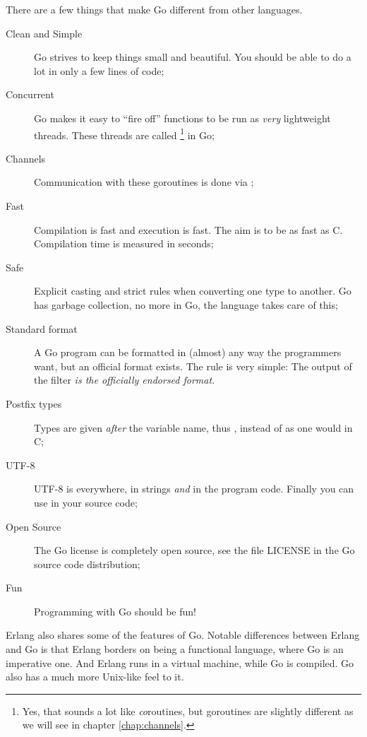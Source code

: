 \noindent{}There are a few things that make Go different from other
languages.
\begin{description}
\item[Clean and Simple]
Go strives to keep things small and beautiful. You should
be able to do a lot in only a few lines of code;
\item[Concurrent]
Go makes it easy to ``fire off'' functions to be
run as \emph{very} lightweight threads. These threads are called
 \footnote{Yes, that sounds a lot like
\emph{co}routines, but goroutines are slightly different as we will
see in chapter \ref{chap:channels}.} in Go;
\item[Channels] 
Communication with these goroutines is done
via  \cite{csp, hoare};

\item[Fast]
Compilation is fast and execution is fast. The aim is
to be as fast as C. Compilation time is measured in seconds;

\item[Safe]
Explicit casting and strict rules when converting one type to another.
Go has garbage collection, no more  in Go, the language takes care of this;

\item[Standard format]
A Go program can be formatted in (almost) any way the programmers want,
but an official format exists. The rule is very simple:
The output of the filter  \emph{is the officially endorsed
format}.

\item[Postfix types]
Types are given \emph{after} the variable name, thus ,
instead of  as one would in C;

\item[UTF-8]
UTF-8 is everywhere, in strings
\emph{and} in the program code. Finally you can use  in your source code;

\item[Open Source]
The Go license is completely open source, see the file LICENSE in the Go
source code distribution;

\item[Fun]
Programming with Go should be fun!

\end{description}
Erlang \cite{erlang} also shares some
of the features of Go. Notable differences between Erlang
and Go is that Erlang borders on being a functional language,
where Go is an imperative one. And Erlang runs in a virtual
machine, while Go is compiled. Go also has a much more Unix-like
feel to it.

